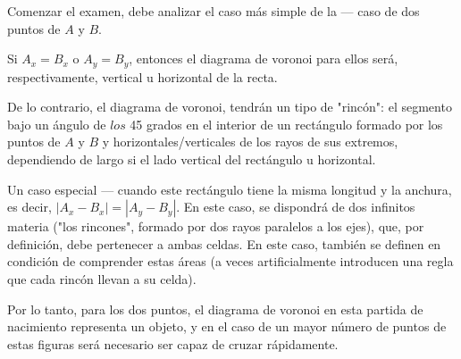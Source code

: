 Comenzar el examen, debe analizar el caso más simple de la --- caso de dos puntos de $A$ y $B$.

Si $A_x=B_x$ o $A_y=B_y$, entonces el diagrama de voronoi para ellos será, respectivamente, vertical u horizontal de la recta.

De lo contrario, el diagrama de voronoi, tendrán un tipo de "rincón": el segmento bajo un ángulo de $los$ 45 grados en el interior de un rectángulo formado por los puntos de $A$ y $B$ y horizontales/verticales de los rayos de sus extremos, dependiendo de largo si el lado vertical del rectángulo u horizontal.

Un caso especial --- cuando este rectángulo tiene la misma longitud y la anchura, es decir, $|A_x-B_x| = |A_y-B_y|$. En este caso, se dispondrá de dos infinitos materia ("los rincones", formado por dos rayos paralelos a los ejes), que, por definición, debe pertenecer a ambas celdas. En este caso, también se definen en condición de comprender estas áreas (a veces artificialmente introducen una regla que cada rincón llevan a su celda).

Por lo tanto, para los dos puntos, el diagrama de voronoi en esta partida de nacimiento representa un objeto, y en el caso de un mayor número de puntos de estas figuras será necesario ser capaz de cruzar rápidamente.
